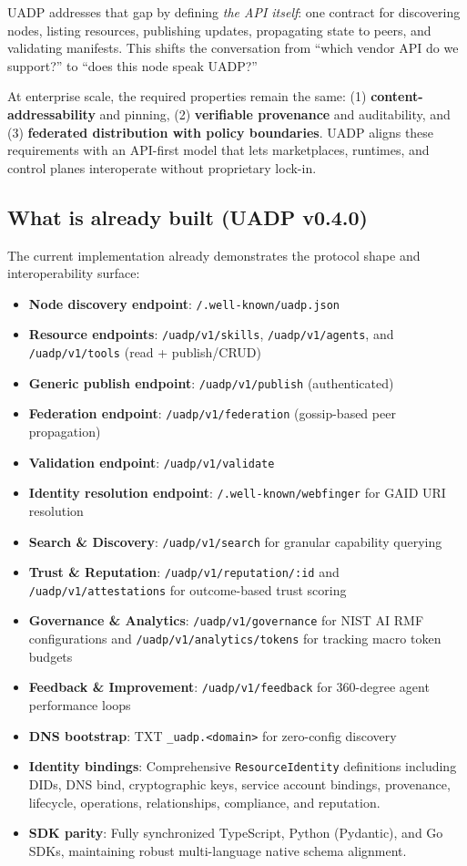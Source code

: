 \documentclass[11pt]{article}
\newcommand{\citeoci}{}
\newcommand{\citesigstore}{}
\newcommand{\citeslsa}{}
\newcommand{\citespiffe}{}
\newcommand{\citecloudevents}{}
\newcommand{\citenats}{}
\begin{document}
UADP addresses that gap by defining \emph{the API itself}: one contract for discovering nodes, listing resources, publishing updates, propagating state to peers, and validating manifests. This shifts the conversation from ``which vendor API do we support?'' to ``does this node speak UADP?''

At enterprise scale, the required properties remain the same: (1) \textbf{content-addressability} and pinning, (2) \textbf{verifiable provenance} and auditability, and (3) \textbf{federated distribution with policy boundaries}. UADP aligns these requirements with an API-first model that lets marketplaces, runtimes, and control planes interoperate without proprietary lock-in.\citeoci\citesigstore\citeslsa\citespiffe\citecloudevents\citenats

\subsection{What is already built (UADP v0.4.0)}
The current implementation already demonstrates the protocol shape and interoperability surface:
\begin{itemize}
  \item \textbf{Node discovery endpoint}: \texttt{/.well-known/uadp.json}
  \item \textbf{Resource endpoints}: \texttt{/uadp/v1/skills}, \texttt{/uadp/v1/agents}, and \texttt{/uadp/v1/tools} (read + publish/CRUD)
  \item \textbf{Generic publish endpoint}: \texttt{/uadp/v1/publish} (authenticated)
  \item \textbf{Federation endpoint}: \texttt{/uadp/v1/federation} (gossip-based peer propagation)
  \item \textbf{Validation endpoint}: \texttt{/uadp/v1/validate}
  \item \textbf{Identity resolution endpoint}: \texttt{/.well-known/webfinger} for GAID URI resolution
  \item \textbf{Search \& Discovery}: \texttt{/uadp/v1/search} for granular capability querying
  \item \textbf{Trust \& Reputation}: \texttt{/uadp/v1/reputation/:id} and \texttt{/uadp/v1/attestations} for outcome-based trust scoring
  \item \textbf{Governance \& Analytics}: \texttt{/uadp/v1/governance} for NIST AI RMF configurations and \texttt{/uadp/v1/analytics/tokens} for tracking macro token budgets
  \item \textbf{Feedback \& Improvement}: \texttt{/uadp/v1/feedback} for 360-degree agent performance loops
  \item \textbf{DNS bootstrap}: TXT \texttt{\_uadp.<domain>} for zero-config discovery
  \item \textbf{Identity bindings}: Comprehensive \texttt{ResourceIdentity} definitions including DIDs, DNS bind, cryptographic keys, service account bindings, provenance, lifecycle, operations, relationships, compliance, and reputation.
  \item \textbf{SDK parity}: Fully synchronized TypeScript, Python (Pydantic), and Go SDKs, maintaining robust multi-language native schema alignment.
\end{itemize}
\end{document}
